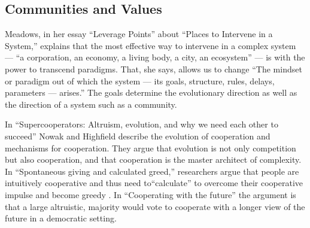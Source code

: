 \subsection{Communities and Values}
\label{intro:communityvalues}

Meadows, in her essay ``Leverage Points'' \cite{meadows_leverage} about ``Places to Intervene in a System,'' explains that the most effective way to intervene in a complex system --- ``a corporation, an economy, a living body, a city, an ecosystem'' --- is with the power to transcend paradigms. That, she says, allows us to change ``The mindset or paradigm out of which the system --- its goals, structure, rules, delays, parameters --- arises.'' The goals determine the evolutionary direction as well as the direction of a system such as a community.

In ``Supercooperators: Altruism, evolution, and why we need each other to succeed'' \cite{nowak2011supercooperators} Nowak and Highfield describe the evolution of cooperation and mechanisms for cooperation. They argue that evolution is not only competition but also cooperation, and that cooperation is the master architect of complexity. In ``Spontaneous giving and calculated greed,'' researchers argue that people are intuitively cooperative and thus need to``calculate'' to overcome their cooperative impulse and become greedy \cite{rand2012spontaneous}. In ``Cooperating with the future'' \cite{hauser2014cooperating} the argument is that a large altruistic, majority would vote to cooperate with a longer view of the future in a democratic setting.


